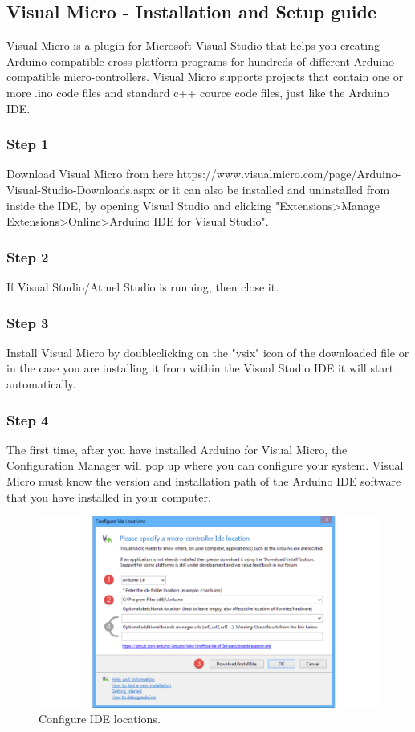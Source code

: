 \begin{refsection}
\subsection{Visual Micro - Installation and Setup guide}
Visual Micro is a plugin for Microsoft Visual Studio that helps you creating Arduino compatible cross-platform programs for hundreds of different Arduino compatible micro-controllers. Visual Micro supports projects that contain one or more .ino code files and standard c++ cource code files, just like the Arduino IDE. 


\subsubsection{Step 1}
Download Visual Micro from here https://www.visualmicro.com/page/Arduino-Visual-Studio-Downloads.aspx or it can also be installed and uninstalled from inside the IDE, by opening Visual Studio and clicking "Extensions>Manage Extensions>Online>Arduino IDE for Visual Studio".

\subsubsection{Step 2}
If Visual Studio/Atmel Studio is running, then close it.

\subsubsection{Step 3}
Install Visual Micro by doubleclicking on the "vsix" icon of the downloaded file or in the case you are installing it from within the Visual Studio IDE it will start automatically.

\subsubsection{Step 4}

The first time, after you have installed Arduino for Visual Micro, the Configuration Manager will pop up where you can configure your system. Visual Micro must know the version and installation path of the Arduino IDE software that you have installed in your computer.

\begin{figure}[H]
	\centering
	\includegraphics[width=1\linewidth]{./sdf/arduino_quantum_rx/figures/configureIDE.pdf}
	\caption{Configure IDE locations.}
	\label{configureIDE}
\end{figure}


\end{refsection}
